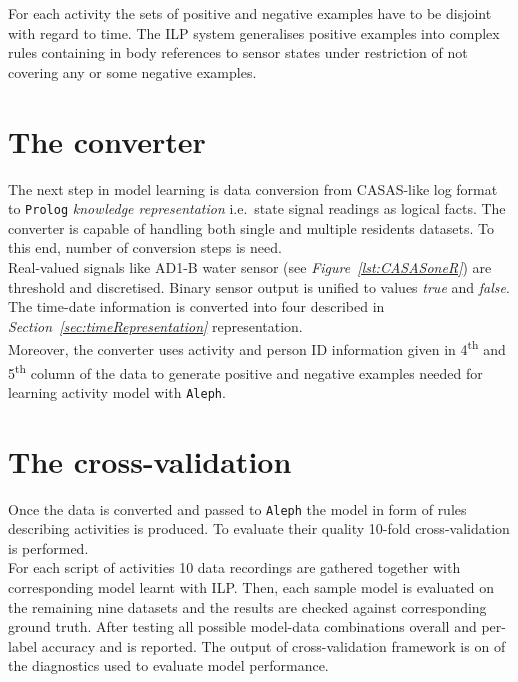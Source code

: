 \documentclass[10pt, a4paper, pdflatex, leqno, twoside, openright]{report}
\newcommand{\ts}{\textsuperscript}
\begin{document}
For each activity the sets of positive and negative examples have to be disjoint with regard to time. The ILP system generalises positive examples into complex rules containing in body references to sensor states under restriction of not covering any or some negative examples.

  \section{The converter}
The next step in model learning is data conversion from CASAS-like log format to \texttt{Prolog} \emph{knowledge representation} i.e.\ state signal readings as logical facts. The converter is capable of handling both single and multiple residents datasets. To this end, number of conversion steps is need.\\

Real-valued signals like AD1-B water sensor (see \emph{Figure~\ref{lst:CASASoneR}}) are threshold and discretised. Binary sensor output is unified to values \emph{true} and \emph{false}. The time-date information is converted into four described in \emph{Section~\ref{sec:timeRepresentation}} representation.\\
Moreover, the converter uses activity and person ID information given in 4\ts{th} and 5\ts{th} column of the data to generate positive and negative examples needed for learning activity model with \texttt{Aleph}.

  \section{The cross-validation}
Once the data is converted and passed to \texttt{Aleph} the model in form of rules describing activities is produced. To evaluate their quality 10-fold cross-validation is performed.\\
For each script of activities 10 data recordings are gathered together with corresponding model learnt with ILP. Then, each sample model is evaluated on the remaining nine datasets and the results are checked against corresponding ground truth. After testing all possible model-data combinations overall and per-label accuracy and is reported. The output of cross-validation framework is on of the diagnostics used to evaluate model performance.


\end{document}
